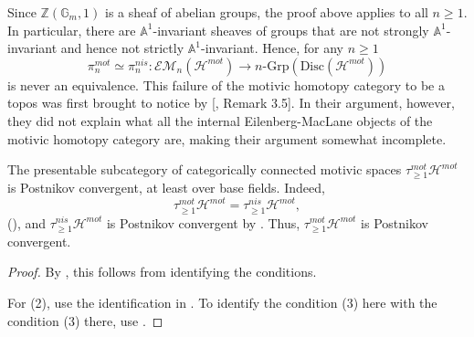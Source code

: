 \begin{rem}
Since $\mathbb{Z}(\mathbb{G}_m,1)$ is a sheaf of abelian groups, the proof above applies to all $n\geq 1$. In particular, there are $\mathbb{A}^1$-invariant sheaves of groups that are not strongly $\mathbb{A}^1$-invariant and hence not strictly $\mathbb{A}^1$-invariant.  Hence, for any $n\geq 1$ $$
\pi_n^{mot}\simeq \pi_n^{nis}:\mathcal{EM}_n(\mathcal{H}^{mot})\to  n{\mbox{-}}\text{Grp}(\text{Disc}(\mathcal{H}^{mot})) $$ is never an equivalence. This failure of the motivic homotopy category to be a topos was first brought to notice by [\cite{spitzweck2012motivic}, Remark 3.5]. In their argument, however, they did not explain what all the internal Eilenberg-MacLane objects of the motivic homotopy category are, making their argument somewhat incomplete.
\end{rem} 

    \begin{rem}\label{post comvg of conn}
 The presentable subcategory of categorically connected motivic spaces $\tau^{mot}_{\geq 1}\mathcal{H}^{mot}$ is Postnikov convergent, at least over base fields. Indeed, $$\tau^{mot}_{\geq 1}\mathcal{H}^{mot}=\tau^{nis}_{\geq 1}\mathcal{H}^{mot},$$ (), and $\tau^{nis}_{\geq 1}\mathcal{H}^{mot}$ is Postnikov convergent by . Thus, $\tau^{mot}_{\geq 1}\mathcal{H}^{mot}$ is Postnikov convergent.
\end{rem}
 \begin{proof}
    By , this follows from identifying the conditions.

    For (2), use the identification in . To identify the condition (3) here with the condition (3) there, use .
 \end{proof}
